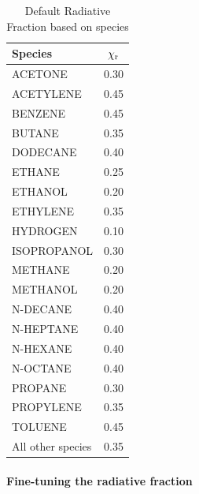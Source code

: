 \documentclass[11pt]{book}
\begin{document}
\begin{table}[!ht]
\caption[Default Radiative Fraction based on FUEL]{Default Radiative Fraction based on species}
\vspace{0.1in}
\label{tab:chi_r}
\begin{center}
\begin{tabular}{|l|c|}
\hline
Species                 &   $\chi_{\rm r}$   \\ \hline \hline
{\ct ACETONE}            & 0.30 \\ \hline
{\ct ACETYLENE}          & 0.45 \\ \hline
{\ct BENZENE}            & 0.45 \\ \hline
{\ct BUTANE}             & 0.35 \\ \hline
{\ct DODECANE}           & 0.40 \\ \hline
{\ct ETHANE}             & 0.25 \\ \hline
{\ct ETHANOL}            & 0.20 \\ \hline
{\ct ETHYLENE}           & 0.35 \\ \hline
{\ct HYDROGEN}           & 0.10 \\ \hline
{\ct ISOPROPANOL}        & 0.30 \\ \hline
{\ct METHANE}            & 0.20 \\ \hline
{\ct METHANOL}           & 0.20 \\ \hline
{\ct N-DECANE}           & 0.40 \\ \hline
{\ct N-HEPTANE}          & 0.40 \\ \hline
{\ct N-HEXANE}           & 0.40 \\ \hline
{\ct N-OCTANE}           & 0.40 \\ \hline
{\ct PROPANE}            & 0.30 \\ \hline
{\ct PROPYLENE}          & 0.35 \\ \hline
{\ct TOLUENE}            & 0.45 \\ \hline
All other species        & 0.35 \\ \hline\end{tabular}
\end{center}
\end{table}

\paragraph{Fine-tuning the radiative fraction}
\end{document}
